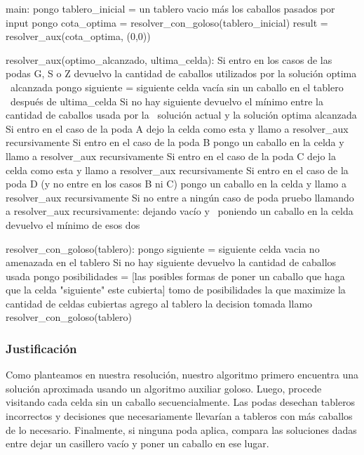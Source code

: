 \begin{codesnippet}
main:
	pongo tablero_inicial = un tablero vacio más los caballos pasados por input
	pongo cota_optima = resolver_con_goloso(tablero_inicial)
	result = resolver_aux(cota_optima, (0,0))

resolver_aux(optimo_alcanzado, ultima_celda):
	Si entro en los casos de las podas G, S o Z
		devuelvo la cantidad de caballos utilizados por la solución optima \
			alcanzada
	pongo siguiente = siguiente celda vacía sin un caballo en el tablero \
		después de ultima_celda
	Si no hay siguiente
		devuelvo el mínimo entre la cantidad de caballos usada por la \ 
			solución actual y la solución optima alcanzada
    Si entro en el caso de la poda A
		dejo la celda como esta y llamo a resolver_aux recursivamente
	Si entro en el caso de la poda B
		pongo un caballo en la celda y llamo a resolver_aux recursivamente
	Si entro en el caso de la poda C
		dejo la celda como esta y llamo a resolver_aux recursivamente
	Si entro en el caso de la poda D (y no entre en los casos B ni C)
		pongo un caballo en la celda y llamo a resolver_aux recursivamente
	Si no entre a ningún caso de poda
		pruebo llamando a resolver_aux recursivamente: dejando vacío y \
			poniendo un caballo en la celda
		devuelvo el mínimo de esos dos

resolver_con_goloso(tablero):
	pongo siguiente = siguiente celda vacia no amenazada en el tablero
    Si no hay siguiente
		devuelvo la cantidad de caballos usada
	pongo posibilidades = [las posibles formas de poner un caballo que haga
		que la celda "siguiente" este cubierta]
	tomo de posibilidades la que maximize la cantidad de celdas cubiertas
	agrego al tablero la decision tomada
	llamo resolver_con_goloso(tablero)

\end{codesnippet}

\subsubsection{Justificación}

Como planteamos en nuestra resolución, nuestro algoritmo primero encuentra una solución aproximada usando un algoritmo auxiliar goloso. Luego, procede visitando cada celda sin un caballo secuencialmente. Las podas desechan tableros incorrectos y decisiones que necesariamente llevarían a tableros con más caballos de lo necesario. Finalmente, si ninguna poda aplica, compara las soluciones dadas entre dejar un casillero vacío y poner un caballo en ese lugar.

